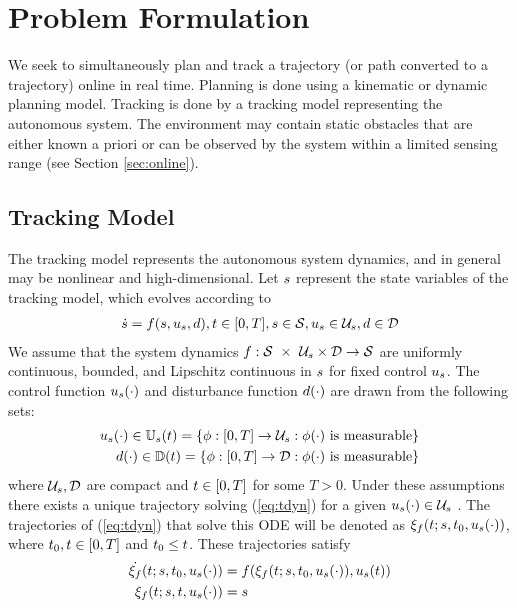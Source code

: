 \section{Problem Formulation \label{sec:formulation}}
We seek to simultaneously plan and track a trajectory (or path converted to a trajectory) online in real time. Planning is done using a kinematic or dynamic planning model. Tracking is done by a tracking model representing the autonomous system. The environment may contain static obstacles that are either known a priori or can be observed by the system within a limited sensing range (see Section \ref{sec:online}).

\subsection{Tracking Model}
The tracking model represents the autonomous system dynamics, and in general may be nonlinear and high-dimensional. Let $s$ represent the state variables of the tracking model, which evolves according to
\begin{equation}
\begin{aligned}
\label{eq:tdyn}
\dot{s} = f(s, u_s, d), t \in [0, T], s \in \mathcal{S}, u_s \in \mathcal{U}_s, d \in \mathcal{D}
\end{aligned}
\end{equation}
We assume that the system dynamics $f : \mathcal{S}\ \times\ \mathcal{U}_s \times \mathcal{D} \rightarrow \mathcal{S}$ are uniformly continuous, bounded, and Lipschitz continuous in $s$ for fixed control $u_s$. The control function $u_s(\cdot)$ and disturbance function $d(\cdot)$ are drawn from the following sets:
\begin{equation}
\begin{aligned}
u_s(\cdot) \in \mathbb{U}_s(t) = \{\phi: [0, T] \rightarrow \mathcal{U}_s: \phi(\cdot) \text{ is measurable}\}\\
d(\cdot) \in \mathbb{D}(t) = \{\phi: [0, T] \rightarrow \mathcal{D}: \phi(\cdot) \text{ is measurable}\}
\end{aligned}
\end{equation}
where $\mathcal{U}_s, \mathcal{D}$ are compact and $t\in[0, T]$ for some $T>0$. Under these assumptions there exists a unique trajectory solving (\ref{eq:tdyn}) for a given $u_s(\cdot) \in \mathcal{U}_s$ \cite{Coddington84}. The trajectories of (\ref{eq:tdyn}) that solve this ODE will be denoted as $\xi_{f}(t; s, t_0, u_s(\cdot))$, where $t_0,t \in [0, T]$ and $t_0 \leq t$. These trajectories satisfy
\begin{equation}
\label{eq:fdyn_traj}
\begin{aligned}
\dot{\xi_{f}}(t; s, t_0, u_s(\cdot)) &= f(\xi_{f}(t; s, t_0, u_s(\cdot)), u_s(t)) \\
\xi_{f}(t; s, t, u_s(\cdot)) &= s
\end{aligned}
\end{equation}

